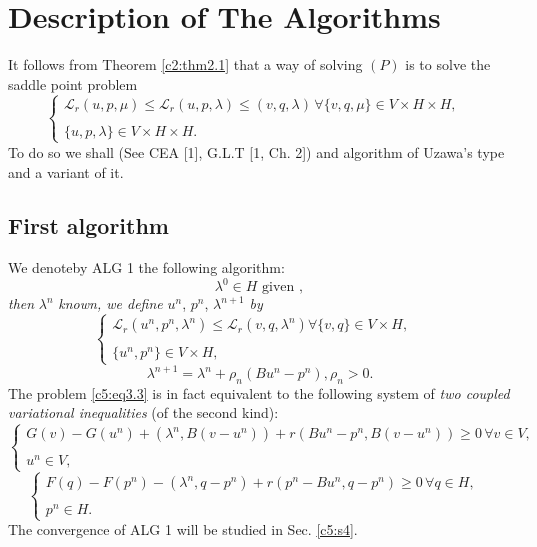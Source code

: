 \section{Description of The Algorithms}\label{c5:s3}%

It follows from Theorem \ref{c2:thm2.1} that a way of solving $(P)$ is to solve
the saddle point problem  
\begin{equation}
\begin{cases}
\mathscr{L}_r (u, p, \mu) \leq \mathscr{L}_r (u, p, \lambda) \leq (v,
q, \lambda)\, \forall \{v, q, \mu \} \in V \times H \times H, \\
& \\
\{u, p, \lambda \} \in V \times H \times H. \tag{3.1}\label{c5:eq3.1}
\end{cases}
\end{equation}
To do so we shall (See CEA [1], G.L.T [1, Ch. 2]) and algorithm of Uzawa's type and a variant of it.

\subsection{First algorithm}\label{c5:ss3.1}%

We denote\pageoriginale  by ALG 1 the following algorithm:
\begin{equation}
\lambda^0 \in H \text{ given }, \tag{3.2}\label{c5:eq3.2}
\end{equation}
\textit{then} $\lambda^n$ \textit{known, we define} $u^n$, $p^n$, $\lambda^{n+1}$ \textit{by}
\begin{equation}
\begin{cases}
\mathscr{L}_r (u^n, p^n, \lambda^n) \leq \mathscr{L}_r (v, q, \lambda^n) 
\forall \{v, q \} \in V \times H, \\
& \\
\{u^n, p^n \} \in V \times H, \tag{3.3}\label{c5:eq3.3}
\end{cases}
\end{equation}
\begin{equation}
\lambda^{n+1} = \lambda^{n} + \rho_n (Bu^n - p^n), \rho_n > 0.\tag{3.4}\label{c5:eq3.4}
\end{equation}
The problem \eqref{c5:eq3.3} is in fact equivalent to the following system of 
\textit{two coupled variational inequalities} (of the second kind):
\begin{equation}
\begin{cases}
G (v) - G (u^n) + (\lambda^n, B(v-u^n))+ r (Bu^n - p^n, B (v-u^n))
\geq 0\, \forall v  \in V, \\ 
& \\
u^n \in V, \tag{3.5}\label{c5:eq3.5}
\end{cases}
\end{equation}
\begin{equation}
\begin{cases}
F (q) - F (p^n) - (\lambda^n, q-p^n) + r (p^n - Bu^n, q-p^n) \geq 0\, \forall q \in H,\\
& \\
p^n \in H.\tag{3.6}\label{c5:eq3.6}
\end{cases}
\end{equation}
The convergence of ALG 1 will be studied in Sec. \ref{c5:s4}.
  
